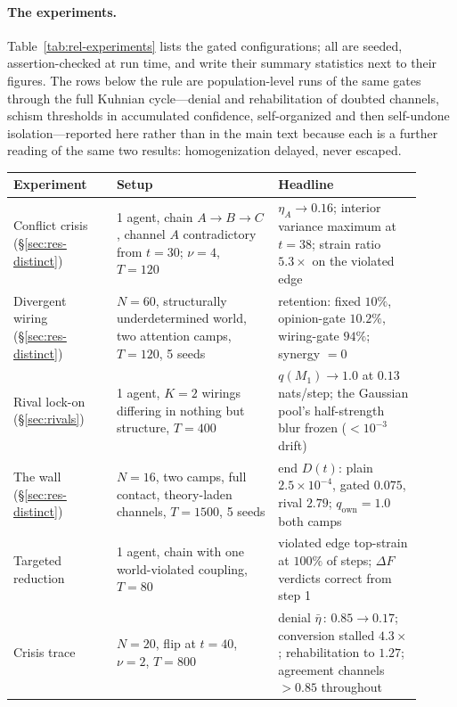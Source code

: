 \documentclass[runningheads]{llncs}
\begin{document}
\paragraph{The experiments.}
Table~\ref{tab:rel-experiments} lists the gated configurations; all are seeded,
assertion-checked at run time, and write their summary statistics next to their figures. The
rows below the rule are population-level runs of the same gates through the full Kuhnian
cycle---denial and rehabilitation of doubted channels, schism thresholds in accumulated
confidence, self-organized and then self-undone isolation---reported here rather than in the
main text because each is a further reading of the same two results: homogenization delayed,
never escaped.

\begin{table}[h!]
\centering\footnotesize
\begin{tabular}{p{0.23\linewidth}p{0.36\linewidth}p{0.32\linewidth}}
\hline
Experiment & Setup & Headline \\
\hline
Conflict crisis (\S\ref{sec:res-distinct}) & 1 agent, chain $A{\to}B{\to}C$, channel $A$
contradictory from $t{=}30$; $\nu{=}4$, $T{=}120$ & $\eta_A\!\to\!0.16$; interior variance
maximum at $t{=}38$; strain ratio $5.3{\times}$ on the violated edge \\[2pt]
Divergent wiring (\S\ref{sec:res-distinct}) & $N{=}60$, structurally underdetermined world, two
attention camps, $T{=}120$, 5 seeds & retention: fixed $10\%$, opinion-gate $10.2\%$,
wiring-gate $94\%$; synergy $=0$ \\[2pt]
Rival lock-on (\S\ref{sec:rivals}) & 1 agent, $K{=}2$ wirings differing in nothing but
structure, $T{=}400$ & $q(M_1)\to1.0$ at $0.13$ nats/step; the Gaussian pool's half-strength
blur frozen ($<10^{-3}$ drift) \\[2pt]
The wall (\S\ref{sec:res-distinct}) & $N{=}16$, two camps, full contact, theory-laden
channels, $T{=}1500$, 5 seeds & end $D(t)$: plain $2.5\times10^{-4}$, gated $0.075$, rival
$2.79$; $q_{\mathrm{own}}=1.0$ both camps \\[2pt]
Targeted reduction & 1 agent, chain with one world-violated coupling,
$T{=}80$ & violated edge top-strain at $100\%$ of steps; $\Delta F$ verdicts correct from step
1 \\[2pt]
\hline
Crisis trace & $N{=}20$, flip at $t{=}40$, $\nu{=}2$, $T{=}800$ &
denial $\bar\eta\,{:}\,0.85\!\to\!0.17$; conversion stalled $4.3{\times}$; rehabilitation to
$1.27$; agreement channels $>0.85$ throughout \\[2pt]

\end{tabular}
\end{table}
\end{document}
